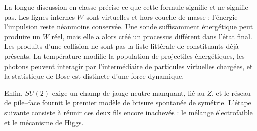 La longue discussion en classe précise ce que cette formule signifie et ne signifie pas. Les lignes internes \(W\) sont virtuelles et hors couche de masse ; l’énergie--l’impulsion reste néanmoins conservée. Une sonde suffisamment énergétique peut produire un \(W\) réel, mais elle a alors créé un processus différent dans l’état final. Les produits d’une collision ne sont pas la liste littérale de constituants déjà présents. La température modifie la population de projectiles énergétiques, les photons peuvent interagir par l’intermédiaire de particules virtuelles chargées, et la statistique de Bose est distincte d’une force dynamique.

Enfin, \(SU(2)\) exige un champ de jauge neutre manquant, lié au \(Z\), et le réseau de pile--face fournit le premier modèle de brisure spontanée de symétrie. L’étape suivante consiste à réunir ces deux fils encore inachevés : le mélange électrofaible et le mécanisme de Higgs.
